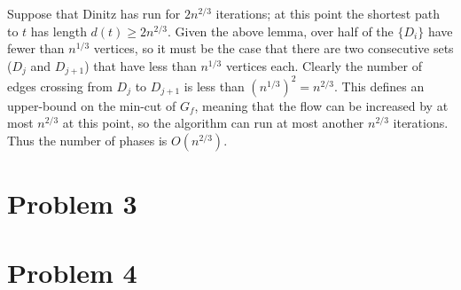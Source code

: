 \documentclass{article}
\begin{document}
Suppose that Dinitz has run for $2n^{2/3}$ iterations; at this point the 
shortest path to $t$ has length $d(t)\geq 2n^{2/3}$. 
Given the above lemma, over half of the $\{D_i\}$ have fewer than
$n^{1/3}$ vertices, so it must be the case that there are two consecutive sets
($D_j$ and $D_{j+1}$) that have less than $n^{1/3}$ vertices each.
Clearly the number of edges crossing from $D_j$ to $D_{j+1}$ is less than $(n^{1/3})^2 = n^{2/3}$.
This defines an upper-bound on the min-cut of $G_f$, meaning that the flow
can be increased by at most $n^{2/3}$ at this point, so 
the algorithm can run at most another $n^{2/3}$ iterations. Thus the number
of phases is $O(n^{2/3})$.

\section*{Problem 3}

\section*{Problem 4}
\end{document}
